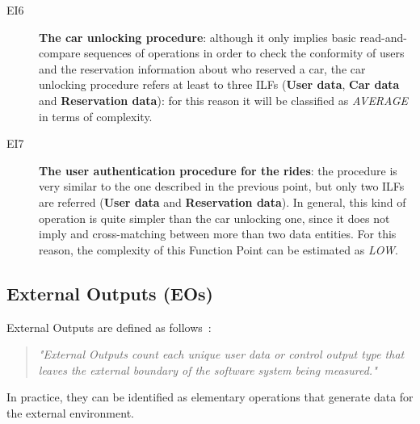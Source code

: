 \begin{description}
\item[EI6] \textbf{The car unlocking procedure}: although it only implies basic read-and-compare sequences of operations in order to check the conformity of users and the reservation information about who reserved a car, the car unlocking procedure refers at least to three ILFs (\textbf{User data}, \textbf{Car data} and \textbf{Reservation data}): for this reason it will be classified as \textit{AVERAGE} in terms of complexity.
\item[EI7] \textbf{The user authentication procedure for the rides}: the procedure is very similar to the one described in the previous point, but only two ILFs are referred (\textbf{User data} and \textbf{Reservation data}). In general, this kind of operation is quite simpler than the car unlocking one, since it does not imply and cross-matching between more than two data entities. For this reason, the complexity of this Function Point can be estimated as \textit{LOW}.
\end{description}

\subsection{External Outputs (EOs)}
External Outputs are defined as follows~\cite{cocomo-manual}:
\begin{quotation}
\textit{"External Outputs count each unique user data or control output type that leaves the external boundary of the software system being measured."}
\end{quotation}
In practice, they can be identified as elementary operations that generate data for the external environment.

